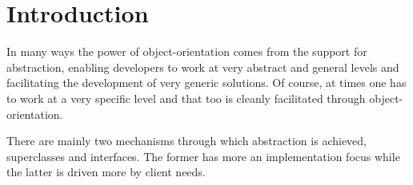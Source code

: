 \section{Introduction}

In many ways the power of object-orientation comes from the support for
abstraction, enabling developers to work at very abstract
and general levels and facilitating the development of very generic solutions.
Of course, at times one has to work at a very specific level and that too is
cleanly facilitated through object-orientation.

There are mainly two mechanisms through which abstraction is achieved,
superclasses and interfaces. The former has more an implementation focus while
the latter is driven more by client needs. 
